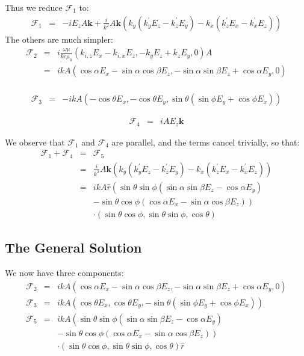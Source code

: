 \documentclass[a4article,12pt]{article}
\newcommand{\kvec}[0]{{\mathbf k}}
\newcommand{\Fcal}[1]{{\mathcal F}_{#1}}
\begin{document}
%
Thus we reduce $\Fcal{1}$ to:
%
\begin{eqnarray}
\Fcal{1} & = & -i E_z A \kvec + \frac{i}{k^2} A \kvec \left( k_y (k_y^{\prime} E_z - k_z^{\prime} E_y) - k_x ( k_z^{\prime} E_x - k_x^{\prime} E_z) \right)
\end{eqnarray}
%
The others are much simpler:
%
\begin{eqnarray}
{\mathcal F}_2 & = & i \frac{\omega \mu}{k c \mu_0} (k_{i,z} E_x - k_{i,x} E_z, -k_y E_z + k_z E_y ,0) A \\
& = & i k A (\cos \alpha E_x - \sin \alpha \cos \beta E_z, -\sin \alpha \sin \beta E_z + \cos \alpha E_y ,0) \\
\end{eqnarray}

\begin{eqnarray}
{\mathcal F}_3 & = & - i k A \left( -\cos \theta E_x, -\cos \theta E_y, \sin \theta ( \sin \phi E_y + \cos \phi E_x) \right)
\end{eqnarray}

\begin{eqnarray}
{\mathcal F}_4 & = & i A E_z  \kvec
\end{eqnarray}

We observe that $\Fcal{1}$ and $\Fcal{4}$ are parallel, and the terms cancel trivially, so that:
%
\begin{eqnarray}
\Fcal{1}+\Fcal{4} & = & \Fcal{5} \\
& = & \frac{i}{k^2} A \kvec \left( k_y (k_y^{\prime} E_z - k_z^{\prime} E_y) - k_x ( k_z^{\prime} E_x - k_x^{\prime} E_z) \right) \\
& = & i k A \hat{r} \left( \sin \theta \sin \phi (\sin \alpha \sin \beta E_z - \cos \alpha E_y) \right. \nonumber \\
&& \left.- \sin \theta \cos \phi ( \cos \alpha E_x - \sin \alpha \cos \beta E_z) \right) \nonumber \\
&& \cdot \left( \sin \theta \cos \phi, \sin \theta \sin \phi, \cos \theta \right)
\end{eqnarray}
%

\subsection{The General Solution}

We now have three components:
%
\begin{eqnarray}
\Fcal{2} & = & i k A (\cos \alpha E_x - \sin \alpha \cos \beta E_z, -\sin \alpha \sin \beta E_z + \cos \alpha E_y ,0) \\
\Fcal{3} & = & i k A \left( \cos \theta E_x, \cos \theta E_y, -\sin \theta ( \sin \phi E_y + \cos \phi E_x) \right) \\
\Fcal{5} & = & i k A \left( \sin \theta \sin \phi (\sin \alpha \sin \beta E_z - \cos \alpha E_y) \right. \nonumber  \\
&& \left. - \sin \theta \cos \phi ( \cos \alpha E_x - \sin \alpha \cos \beta E_z) \right) \nonumber \\
&& \cdot \left( \sin \theta \cos \phi, \sin \theta \sin \phi, \cos \theta \right) \hat{r}
\end{eqnarray}
\end{document}
